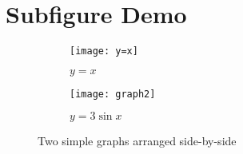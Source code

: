 \documentclass[10pt,a4paper]{article}
\begin{document}
	\section*{Subfigure Demo} 
	\begin{figure}[h]
		\centering
		\begin{subfigure}[b]{0.4\textwidth}
			\centering
			\texttt{[image: y=x]} 
			\caption{$y=x$}
			\label{fig:y equals x}
		\end{subfigure}
		\hfill
		\begin{subfigure}[b]{0.4\textwidth}
			\centering
			\texttt{[image: graph2]}
			\caption{$y=3\sin x$}
			\label{fig:three sin x}
		\end{subfigure}
		\hfill
		\caption{Two simple graphs arranged side-by-side}
		\label{fig:two graphs}
	\end{figure}
\end{document}
